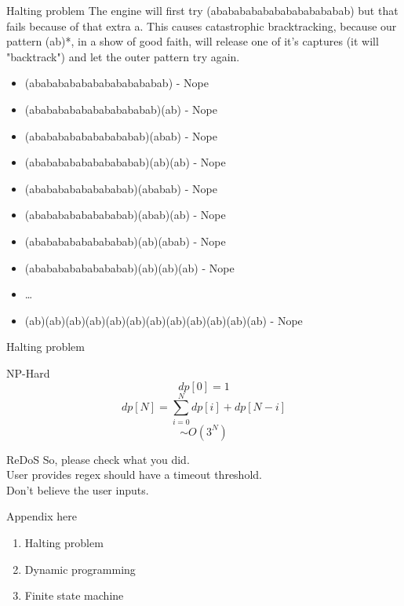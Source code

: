 \documentclass{beamer}
\begin{document}
\begin{CJK*}{UTF8}{bsmi}
    \begin{frame}{Halting problem}
        The engine will first try (abababababababababababab) but that
        fails because of that extra a. This causes catastrophic bracktracking,
        because our pattern (ab)*, in a show of good faith, will release
        one of it's captures (it will "backtrack") and let the outer
        pattern try again.
        \begin{itemize}
            \item (abababababababababababab) - Nope
            \item (ababababababababababab)(ab) - Nope
            \item (abababababababababab)(abab) - Nope
            \item (abababababababababab)(ab)(ab) - Nope
            \item (ababababababababab)(ababab) - Nope
            \item (ababababababababab)(abab)(ab) - Nope
            \item (ababababababababab)(ab)(abab) - Nope
            \item (ababababababababab)(ab)(ab)(ab) - Nope
            \item \dots
            \item (ab)(ab)(ab)(ab)(ab)(ab)(ab)(ab)(ab)(ab)(ab)(ab) - Nope
        \end{itemize}
    \end{frame}

    \begin{frame}{Halting problem}
        \begin{center}
            \LARGE {NP-Hard}
            $$dp[0] = 1$$
            $$dp[N]=\sum^{N}_{i=0}{dp[i] + dp[N-i]} $$
            $$\sim O(3^N) $$
        \end{center}
    \end{frame}

    \begin{frame}{ReDoS}
        So, please check what you did.\\
        User provides regex should have a timeout threshold.\\
        Don't believe the user inputs.
    \end{frame}

    \begin{frame}{Appendix here}
        \begin{enumerate}
            \item Halting problem
            \item Dynamic programming
            \item Finite state machine
        \end{enumerate}
    \end{frame}


\end{CJK*}
\end{document}
